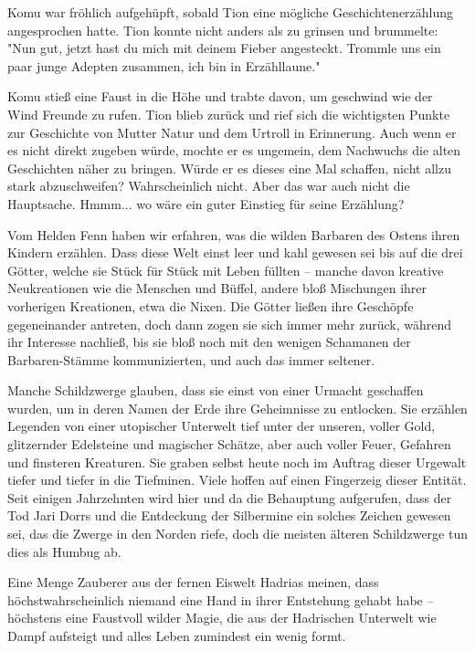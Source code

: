 Komu war fröhlich aufgehüpft, sobald Tion eine mögliche Geschichtenerzählung angesprochen hatte. Tion konnte nicht anders als zu grinsen und brummelte: "Nun gut, jetzt hast du mich mit deinem Fieber angesteckt. Trommle uns ein paar junge Adepten zusammen, ich bin in Erzähllaune."

Komu stieß eine Faust in die Höhe und trabte davon, um geschwind wie der Wind Freunde zu rufen. Tion blieb zurück und rief sich die wichtigsten Punkte zur Geschichte von Mutter Natur und dem Urtroll in Erinnerung. Auch wenn er es nicht direkt zugeben würde, mochte er es ungemein, dem Nachwuchs die alten Geschichten näher zu bringen. Würde er es dieses eine Mal schaffen, nicht allzu stark abzuschweifen? Wahrscheinlich nicht. Aber das war auch nicht die Hauptsache. Hmmm... wo wäre ein guter Einstieg für seine Erzählung?

\trennzeichen

Vom Helden Fenn haben wir erfahren, was die wilden Barbaren des Ostens ihren Kindern erzählen. Dass diese Welt einst leer und kahl gewesen sei bis auf die drei Götter, welche sie Stück für Stück mit Leben füllten – manche davon kreative Neukreationen wie die Menschen und Büffel, andere bloß Mischungen ihrer vorherigen Kreationen, etwa die Nixen. Die Götter ließen ihre Geschöpfe gegeneinander antreten, doch dann zogen sie sich immer mehr zurück, während ihr Interesse nachließ, bis sie bloß noch mit den wenigen Schamanen der Barbaren-Stämme kommunizierten, und auch das immer seltener.

\trennzeichen

Manche Schildzwerge glauben, dass sie einst von einer Urmacht geschaffen wurden, um in deren Namen der Erde ihre Geheimnisse zu entlocken. Sie erzählen Legenden von einer utopischer Unterwelt tief unter der unseren, voller Gold, glitzernder Edelsteine und magischer Schätze, aber auch voller Feuer, Gefahren und finsteren Kreaturen. Sie graben selbst heute noch im Auftrag dieser Urgewalt tiefer und tiefer in die Tiefminen. Viele hoffen auf einen Fingerzeig dieser Entität. Seit einigen Jahrzehnten wird hier und da die Behauptung aufgerufen, dass der Tod Jari Dorrs und die Entdeckung der Silbermine ein solches Zeichen gewesen sei, das die Zwerge in den Norden riefe, doch die meisten älteren Schildzwerge tun dies als Humbug ab.

\trennzeichen

Eine Menge Zauberer aus der fernen Eiswelt Hadrias meinen, dass höchstwahrscheinlich niemand eine Hand in ihrer Entstehung gehabt habe – höchstens eine Faustvoll wilder Magie, die aus der Hadrischen Unterwelt wie Dampf aufsteigt und alles Leben zumindest ein wenig formt.

